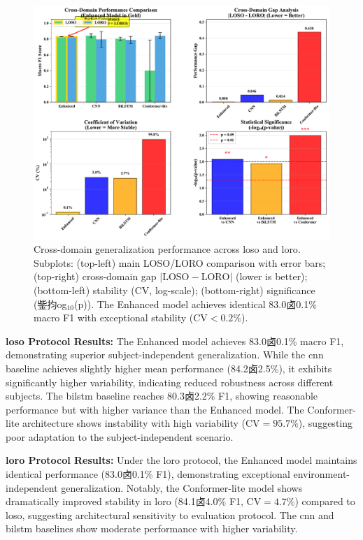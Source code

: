 \documentclass[journal]{IEEEtran}
\begin{document}
\begin{figure}[ht]
\centering
\includegraphics[width=\columnwidth]{figures/figure5_cross-domain.pdf}
\caption{Cross-domain generalization performance across \gls{loso} and \gls{loro}. Subplots: (top-left) main LOSO/LORO comparison with error bars; (top-right) cross-domain gap $|\text{LOSO}-\text{LORO}|$ (lower is better); (bottom-left) stability (CV, log-scale); (bottom-right) significance (鈭抣og$_{10}$(p)). The Enhanced model achieves identical 83.0卤0.1\% macro F1 with exceptional stability ($\text{CV}<0.2\%$).}
\label{fig:cross_domain}
\end{figure}



\textbf{\gls{loso} Protocol Results:} The Enhanced model achieves 83.0卤0.1\% macro F1, demonstrating superior subject-independent generalization. While the \gls{cnn} baseline achieves slightly higher mean performance (84.2卤2.5\%), it exhibits significantly higher variability, indicating reduced robustness across different subjects. The \gls{bilstm} baseline reaches 80.3卤2.2\% F1, showing reasonable performance but with higher variance than the Enhanced model. The Conformer-lite architecture shows instability with high variability ($\text{CV}=95.7\%$), suggesting poor adaptation to the subject-independent scenario.

\textbf{\gls{loro} Protocol Results:} Under the \gls{loro} protocol, the Enhanced model maintains identical performance (83.0卤0.1\% F1), demonstrating exceptional environment-independent generalization. Notably, the Conformer-lite model shows dramatically improved stability in \gls{loro} (84.1卤4.0\% F1, $\text{CV}=4.7\%$) compared to \gls{loso}, suggesting architectural sensitivity to evaluation protocol. The \gls{cnn} and \gls{bilstm} baselines show moderate performance with higher variability.
\end{document}
